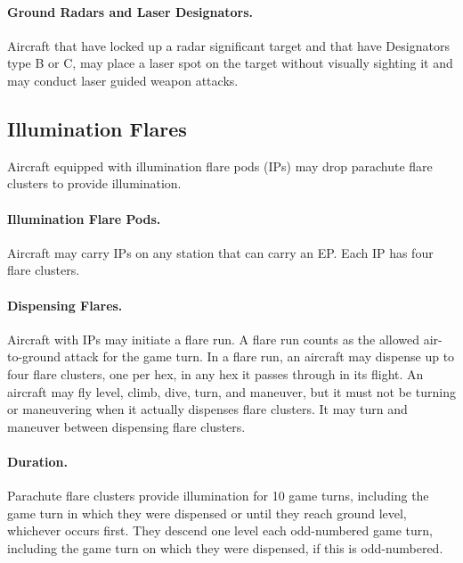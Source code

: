 \begin{advancedrules}
{\paragraph{Ground Radars and Laser Designators.} Aircraft that have locked up a radar significant target and that have Designators type B or C, may place a laser spot on the target without visually sighting it and may conduct laser guided weapon attacks.


}{

\subsection{Illumination Flares}

Aircraft equipped with illumination flare pods (IPs) may drop parachute flare clusters to provide illumination.

\paragraph{Illumination Flare Pods.} Aircraft may carry IPs on any station that can carry an EP. Each IP has four flare clusters.  

\paragraph{Dispensing Flares.} Aircraft with IPs may initiate a flare run. A flare run counts as the allowed air-to-ground attack for the game turn. In a flare run, an aircraft may dispense up to four flare clusters, one per hex, in any hex it passes through in its flight. An aircraft may fly level, climb, dive, turn, and maneuver, but it must not be turning or maneuvering when it actually dispenses flare clusters. It may turn and maneuver between dispensing flare clusters.

\paragraph{Duration.} Parachute flare clusters provide illumination for 10 game turns, including the game turn in which they were dispensed or until they reach ground level, whichever occurs first. They descend one level each odd-numbered game turn, including the game turn on which they were dispensed, if this is odd-numbered.

}
\end{advancedrules}
